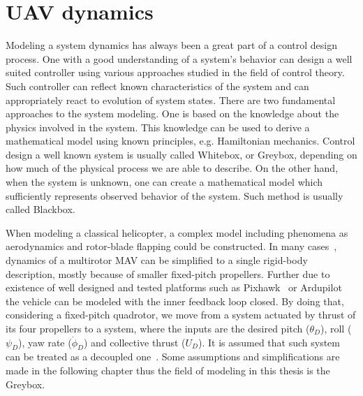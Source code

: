 \section{UAV dynamics}
\label{chap:uav_dynamics}

Modeling a system dynamics has always been a great part of a control design process. One with a good understanding of a system's behavior can design a well suited controller using various approaches studied in the field of control theory. Such controller can reflect known characteristics of the system and can appropriately react to evolution of system states. There are two fundamental approaches to the system modeling. One is based on the knowledge about the physics involved in the system. This knowledge can be used to derive a mathematical model using known principles, e.g. Hamiltonian mechanics. Control design a well known system is usually called Whitebox, or Greybox, depending on how much of the physical process we are able to describe. On the other hand, when the system is unknown, one can create a mathematical model which sufficiently represents observed behavior of the system. Such method is usually called Blackbox.

When modeling a classical helicopter, a complex model including phenomena as aerodynamics and rotor-blade flapping could be constructed. In many cases~\citep{alexis2014rmpc, mahony2012multirotor}, dynamics of a multirotor MAV can be simplified to a single rigid-body description, mostly because of smaller fixed-pitch propellers. Further due to existence of well designed and tested platforms such as Pixhawk~\citep{pixhawk} or Ardupilot~\citep{ardupilot} the vehicle can be modeled with the inner feedback loop closed. By doing that, considering a fixed-pitch quadrotor, we move from a system actuated by thrust of its four propellers to a system, where the inputs are the desired pitch ($\theta_D$), roll ($\psi_D$), yaw rate ($\dot{\phi}_D$) and collective thrust ($U_D$). It is assumed that such system can be treated as a decoupled one~\citep{mahony2012multirotor}. Some assumptions and simplifications are made in the following chapter thus the field of modeling in this thesis is the Greybox.


